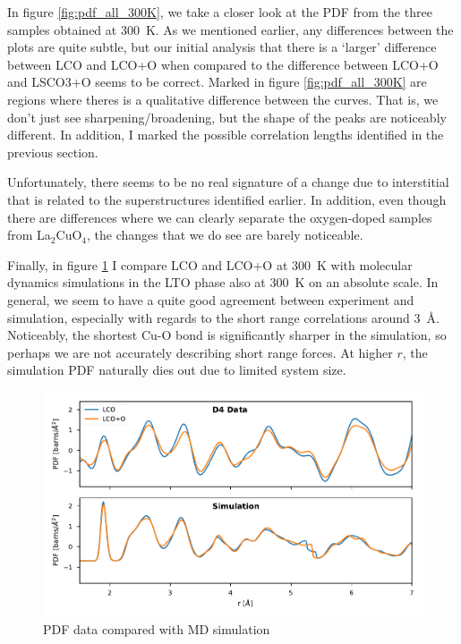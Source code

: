 In figure \ref{fig:pdf_all_300K}, we take a closer look at the PDF from the three samples obtained at \SI{300}{\kelvin}. As we mentioned earlier, any differences between the plots are quite subtle, but our initial analysis that there is a `larger' difference between LCO and LCO+O when compared to the difference between LCO+O and LSCO3+O seems to be correct. Marked in figure \ref{fig:pdf_all_300K} are regions where theres is a qualitative difference between the curves. That is, we don't just see sharpening/broadening, but the shape of the peaks are noticeably different. In addition, I marked the possible correlation lengths identified in the previous section.

Unfortunately, there seems to be no real signature of a change due to interstitial that is related to the superstructures identified earlier. In addition, even though there are differences where we can clearly separate the oxygen-doped samples from La$_2$CuO$_4$, the changes that we do see are barely noticeable.

Finally, in figure \ref{fig:pdf_sim_comparision} I compare LCO and LCO+O at \SI{300}{\kelvin} with molecular dynamics simulations in the LTO phase also at \SI{300}{\kelvin} on an absolute scale. In general, we seem to have a quite good agreement between experiment and simulation, especially with regards to the short range correlations around \SI{3}{\angstrom}. Noticeably, the shortest Cu-O bond is significantly sharper in the simulation, so perhaps we are not accurately describing short range forces. At higher $r$, the simulation PDF naturally dies out due to limited system size.

\begin{figure}
    \centering
    \includegraphics[width=\textwidth]{fig/pdf/pdf_simulation_experiment_compare.pdf}
    \caption[PDF data compared with MD simulation]{PDF data compared with MD simulation}
    \label{fig:pdf_sim_comparision}
\end{figure}

